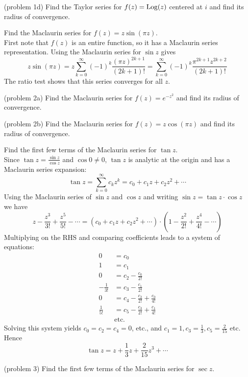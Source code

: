 \documentclass[handout]{ximera}
\begin{document}
\begin{problem}(problem 1d)
Find the Taylor series for $f(z) = \operatorname{Log}(z)$ centered at $i$ and find its radius of convergence.
\end{problem}


\begin{example}[example 2]
Find the Maclaurin series for $f(z) = z\sin(\pi z)$.\\
First note that $f(z)$ is an entire function, so it has a Maclaurin series representation.
Using the Maclaurin series for $\sin z$ gives
\[
z\sin(\pi z) = z\sum_{k=0}^\infty (-1)^k \frac{(\pi z)^{2k+1}}{(2k+1)!} = \sum_{k=0}^\infty (-1)^k \frac{\pi^{2k+1} z^{2k+2}}{(2k+1)!}
\]
The ratio test shows that this series converges for all $z$.
\end{example}

\begin{problem}(problem 2a)
Find the Maclaurin series for $f(z) = e^{-z^2}$ and find its radius of convergence.
\end{problem}

\begin{problem}(problem 2b)
Find the Maclaurin series for $f(z) = z\cos(\pi z)$ and find its radius of convergence.
\end{problem}

\begin{example}[example 3]
Find the first few terms of the Maclaurin series for $\tan z$.\\
Since $\tan z = \frac{\sin z}{\cos z}$ and $\cos 0 \neq 0$, $\tan z$ is analytic at the origin 
and has a Maclaurin series expansion:
\[
\tan z = \sum_{k=0}^\infty c_k z^k = c_0 + c_1 z + c_2 z^2 + \cdots
\]
Using the Maclaurin series of $\sin z$ and $\cos z$ and writing $\sin z = \tan z \cdot \cos z$ we have
\[
z-\frac{z^3}{3!} + \frac{z^5}{5!} - \cdots = \left(c_0 + c_1 z + c_2 z^2 + \cdots\right) \cdot \left(1-\frac{z^2}{2!} + \frac{z^4}{4!} - \cdots \right)
\]
Multiplying on the RHS and comparing coefficients leads to a system of equations:
\begin{align*}
0 & = c_0 \\
1 & = c_1 \\
0 & = c_2 -\frac{c_0}{2!} \\
-\frac{1}{3!} & =  c_3- \frac{c_1}{2!} \\
0 & = c_4 - \frac{c_2}{2!} +  \frac{c_0}{4!} \\
 \frac{1}{5!} & = c_5- \frac{c_3}{2!} +  \frac{c_1}{4!}\\
 & \text{etc.}
\end{align*}
Solving this system yields $c_0 = c_2 = c_4 = 0$, etc., and  $c_1 = 1, c_3 = \frac13, c_5 = \frac{2}{15}$ etc.
Hence 
\[
\tan z = z + \frac13 z + \frac{2}{15}z^3 + \cdots
\]
\end{example}

\begin{problem}(problem 3)
Find the first few terms of the Maclaurin series for $\sec z$.
\end{problem}
\end{document}
